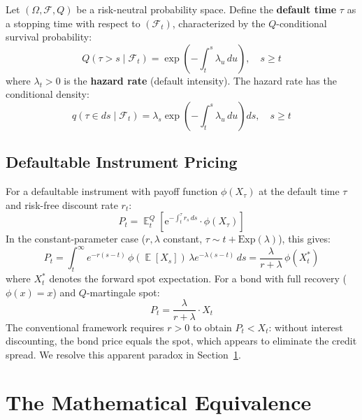 \documentclass[10pt,twocolumn]{article}
\theoremstyle{plain}
\theoremstyle{definition}
\DeclareMathOperator{\E}{\mathbb{E}}
\newcommand{\F}{\mathcal{F}}
\begin{document}
Let $(\Omega, \F, Q)$ be a risk-neutral probability space. Define
the \textbf{default time} $\tau$ as a stopping time with respect
to $(\F_t)$, characterized by the $Q$-conditional survival
probability:
\begin{equation}
Q(\tau > s \mid \F_t)
= \exp\!\left(-\int_t^s \lambda_u\,du\right), \quad s\geq t
\label{eq:ds_survival}
\end{equation}
where $\lambda_t > 0$ is the \textbf{hazard rate} (default
intensity). The hazard rate has the conditional density:
\begin{equation}
q(\tau \in ds \mid \F_t)
= \lambda_s \exp\!\left(-\int_t^s \lambda_u\,du\right)ds,
\quad s\geq t
\label{eq:ds_density}
\end{equation}

\subsection{Defaultable Instrument Pricing}

For a defaultable instrument with payoff function $\phi(X_\tau)$
at the default time $\tau$ and risk-free discount rate $r_t$:
\begin{equation}
P_t = \E^Q_t\!\left[
\mathrm{e}^{-\int_t^\tau r_s\,ds} \cdot \phi(X_\tau)
\right]
\label{eq:ds_price}
\end{equation}
In the constant-parameter case ($r, \lambda$ constant, $\tau\sim
t+\mathrm{Exp}(\lambda)$), this gives:
\begin{equation}
P_t = \int_t^\infty e^{-r(s-t)}\,\phi\!\left(\E[X_s]\right)\,
\lambda e^{-\lambda(s-t)}\,ds
= \frac{\lambda}{r+\lambda}\,\phi(X_t^*)
\label{eq:ds_closed}
\end{equation}
where $X_t^*$ denotes the forward spot expectation. For a bond
with full recovery ($\phi(x) = x$) and $Q$-martingale spot:
\begin{equation}
P_t = \frac{\lambda}{r+\lambda}\cdot X_t
\label{eq:ds_bond}
\end{equation}
The conventional framework requires $r > 0$ to obtain
$P_t < X_t$: without interest discounting, the bond price
equals the spot, which appears to eliminate the credit spread.
We resolve this apparent paradox in Section~\ref{sec:equiv}.

\section{The Mathematical Equivalence}
\label{sec:equiv}
\end{document}
